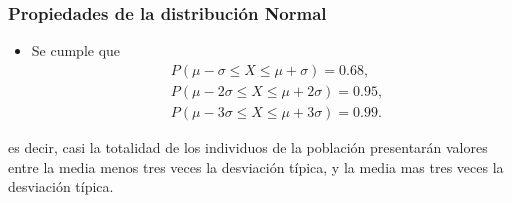 \begin{frame}
\frametitle{Propiedades de la distribución Normal}
\begin{itemize}
\item Se cumple que
\begin{align*}
& P(\mu-\sigma \leq X \leq \mu+\sigma) = 0.68,\\
& P(\mu-2\sigma \leq X \leq \mu+2\sigma) = 0.95,\\
& P(\mu-3\sigma \leq X \leq \mu+3\sigma) = 0.99.
\end{align*}
\end{itemize}
\begin{center}
\scalebox{0.6}{}
\end{center}

es decir, casi la totalidad de los individuos de la población presentarán valores entre la media menos tres veces la desviación típica, y la
media mas tres veces la desviación típica.
\end{frame}


